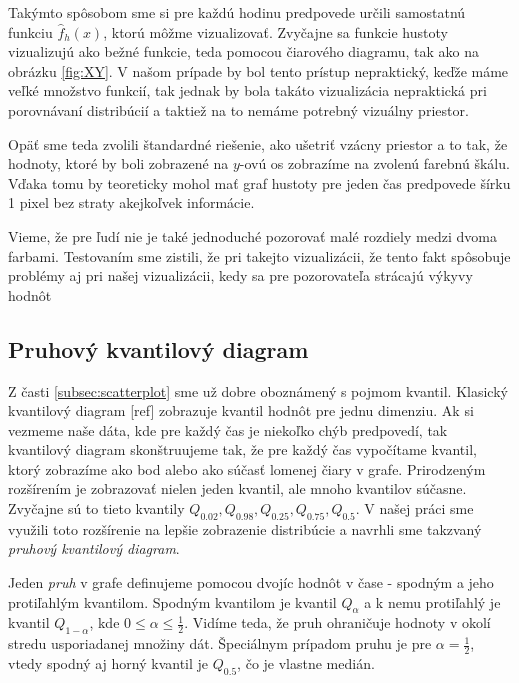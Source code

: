 Takýmto spôsobom sme si pre každú hodinu predpovede určili samostatnú funkciu $ \hat{f}_{h}(x) $, ktorú môžme vizualizovať. Zvyčajne sa funkcie hustoty vizualizujú ako bežné funkcie, teda pomocou čiarového diagramu, tak ako na obrázku \ref{fig:XY}. V našom prípade by bol tento prístup nepraktický, keďže máme veľké množstvo funkcií, tak jednak by bola takáto vizualizácia nepraktická pri porovnávaní distribúcií a taktiež na to nemáme potrebný vizuálny priestor.

Opäť sme teda zvolili štandardné riešenie, ako ušetriť vzácny priestor a to tak, že hodnoty, ktoré by boli zobrazené na $ y $-ovú os zobrazíme na zvolenú farebnú škálu. Vďaka tomu by teoreticky mohol mať graf hustoty pre jeden čas predpovede šírku 1 pixel bez straty akejkoľvek informácie.

Vieme, že pre ľudí nie je také jednoduché pozorovať malé rozdiely medzi dvoma farbami. Testovaním sme zistili, že pri takejto vizualizácii, že tento fakt spôsobuje problémy aj pri našej vizualizácii, kedy sa pre pozorovateľa strácajú výkyvy hodnôt


\subsection{Pruhový kvantilový diagram} 
Z časti \ref{subsec:scatterplot} sme už dobre oboznámený s pojmom kvantil. Klasický kvantilový diagram [ref] zobrazuje kvantil hodnôt pre jednu dimenziu. Ak si vezmeme naše dáta, kde pre každý čas je niekoľko chýb predpovedí, tak kvantilový diagram skonštruujeme tak, že pre každý čas vypočítame kvantil, ktorý zobrazíme ako bod alebo ako súčasť lomenej čiary v grafe.
Prirodzeným rozšírením je zobrazovať nielen jeden kvantil, ale mnoho kvantilov súčasne. Zvyčajne sú to tieto kvantily $ Q_{0.02}, Q_{0.98}, Q_{0.25}, Q_{0.75}, Q_{0.5} $. V našej práci sme využili toto rozšírenie na lepšie zobrazenie distribúcie a navrhli sme takzvaný \textit{pruhový kvantilový diagram}.

Jeden \textit{pruh} v grafe definujeme pomocou dvojíc hodnôt v čase - spodným a jeho protiľahlým kvantilom. Spodným kvantilom je kvantil $ Q_{\alpha} $ a k nemu protiľahlý je kvantil $ Q_{1 - \alpha} $, kde $ 0 \leq \alpha \leq \frac{1}{2} $. Vidíme teda, že pruh ohraničuje hodnoty v okolí stredu usporiadanej množiny dát. Špeciálnym prípadom pruhu je pre $ \alpha = \frac{1}{2} $, vtedy spodný aj horný kvantil je $ Q_{0.5} $, čo je vlastne medián.

